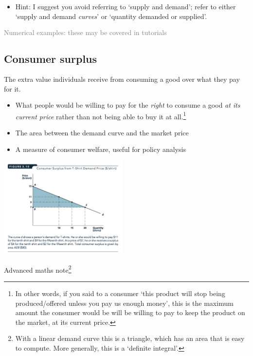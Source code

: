 \documentclass[]{article}
\providecommand{\tightlist}{%
  \setlength{\itemsep}{0pt}\setlength{\parskip}{0pt}}
\begin{document}
\begin{itemize}
\tightlist
\item
  Hint: I suggest you avoid referring to `supply and demand'; refer to
  either `supply and demand \emph{curves}' or `quantity demanded or
  supplied'.
\end{itemize}

\textcolor{gray}{Numerical examples: these may be covered in tutorials}

\hypertarget{consumer-surplus}{%
\subsection{Consumer surplus}\label{consumer-surplus}}

\begin{description}
\tightlist
\item[Consumer surplus]
The extra value individuals receive from consuming a good over what they
pay for it.
\end{description}

\bigskip

\begin{itemize}
\item
  What people would be willing to pay for the \emph{right} to consume a
  good \emph{at its current price} rather than not being able to buy it
  at all.\footnote{In other words, if you said to a consumer `this
    product will stop being produced/offered unless you pay us enough
    money', this is the maximum amount the consumer would be will be
    willing to pay to keep the product on the market, at its current
    price.}
\item
  The area between the demand curve and the market price
\item
  A measure of consumer welfare, useful for policy analysis
\end{itemize}

\includegraphics[height=2in]{picsfigs/cons_surplus.png}

\textcolor{RawSienna}{Advanced maths note}\footnote{With a linear demand
  curve this is a triangle, which has an area that is easy to compute.
  More generally, this is a `definite integral'.}
\end{document}
